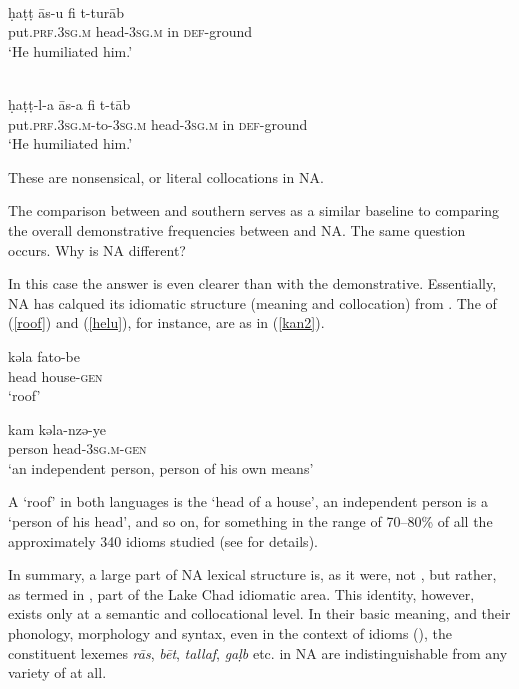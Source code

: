 \documentclass[output=paper]{langsci/langscibook}
\begin{document}
\ea
\ea {} \\
\gll ḥaṭṭ {\R}ās-u fi t-turāb\\
     put.\textsc{prf.3sg.m} head-\textsc{3sg.m} in \textsc{def}{}-ground\\
\glt ‘He humiliated him.’ \label{owens:egy}

\ex {}  \\
\gll ḥaṭṭ-l-a {\R}ās-a fi t-t{\R}āb\\
     put.\textsc{prf.3sg.m}-to-\textsc{3sg.m} head-\textsc{3sg.m} in \textsc{def}{}-ground\\
\glt ‘He humiliated him.’ \label{tun}
\z
\z

These are nonsensical, or literal collocations in NA.

The comparison between  and southern   serves as a similar baseline to comparing the overall demonstrative frequencies between  and NA. The same question occurs. Why is NA different?


In this case the answer is even clearer than with the demonstrative. Essentially, NA has calqued its {idiomatic} structure (meaning and collocation) from . The  of (\ref{roof}) and (\ref{helu}), for instance, are as in (\ref{kan2}).

\ea\label{kan2}
\ea
\gll kəla fato-be\\
     head house-\textsc{gen}\\
\glt ‘roof’\label{fato}

\ex
\gll kam kəla-nzə-ye\\
     person head-\textsc{3sg.m}{}-\textsc{gen}\\
\glt ‘an independent person, person of his own means’\label{kam}
\z
\z

A ‘roof’ in both languages is the ‘head of a house’, an independent person is a ‘person of his head’, and so on, for something in the range of 70–80\% of all the approximately 340 {idioms} studied (see \citealt{Owens1996,Owens2014,Owens2015,Owens2016idioms} for details).

In summary, a large part of NA lexical structure is, as it were, not , but rather, as termed in \citet{Owens1998}, part of the {Lake Chad} {idiomatic} area. This {identity}, however, exists only at a semantic and collocational level. In their basic meaning, and their phonology, morphology and syntax, even in the context of {idioms} (\citealt{OwensDodsworth2017}), the constituent lexemes \textit{rās}, \textit{bēt}, \textit{tallaf}, \textit{gaḷb} etc. in NA are indistinguishable from any variety of  at all.
\end{document}
